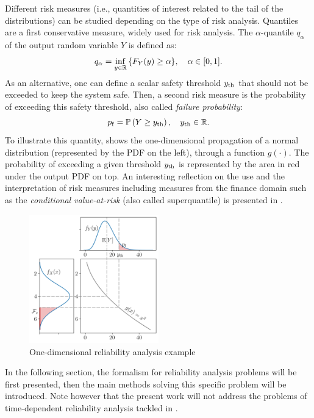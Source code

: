 Different risk measures (i.e., quantities of interest related to the tail of the distributions) can be studied depending on the type of risk analysis. 
Quantiles are a first conservative measure, widely used for risk analysis. 
The $\alpha$-quantile $q_\alpha$ of the output random variable $Y$ is defined as:
\begin{equation}
    q_\alpha = \inf_{y\in\mathbb{R}}{\left\{F_Y(y) \geq \alpha\right\}}, \quad \alpha \in [0, 1].    
\end{equation}
As an alternative, one can define a scalar safety threshold $y_\mathrm{th}$ that should not be exceeded to keep the system safe. 
Then, a second risk measure is the probability of exceeding this safety threshold, also called \textit{failure probability}: 
\begin{equation}
    p_\mathrm{f} = \mathbb{P}\left(Y \geq y_\mathrm{th}\right), \quad y_\mathrm{th}\in\mathbb{R}.
    \label{eq:failure_proba}
\end{equation}
To illustrate this quantity,  shows the one-dimensional propagation of a normal distribution (represented by the PDF on the left), through a function $g(\cdot)$.
The probability of exceeding a given threshold $y_\mathrm{th}$ is represented by the area in red under the output PDF on top.
An interesting reflection on the use and the interpretation of risk measures including measures from the finance domain such as the \textit{conditional value-at-risk} (also called superquantile) is presented in \citet{rockafellar_2015}. 

\begin{figure}
    \centering
    \includegraphics[width=0.5\textwidth]{../numerical_experiments/chapter1/figures/1D_reliability.png}
    \caption{One-dimensional reliability analysis example}
    \label{fig:1D_reliability}
\end{figure}

In the following section, the formalism for reliability analysis problems will be first presented, 
then the main methods solving this specific problem will be introduced. 
Note however that the present work will not address the problems of time-dependent reliability analysis tackled in \citet{hawchar_2017}. 

